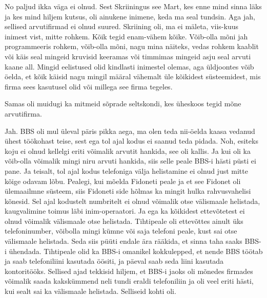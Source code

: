 
No paljud ikka väga ei olnud. Sest Skriiningus see Mart, kes enne mind sinna 
läks ja kes mind hiljem kutsus, oli ainukene inimene, keda ma seal tundsin. Aga 
jah, sellised arvutifirmad ei olnud suured. Skriining oli, ma ei mäleta, viis-kuus 
inimest vist, mitte rohkem. Kõik tegid  enam-vähem kõike. Võib-olla 
mõni jah programmeeris rohkem, võib-olla mõni, nagu mina näiteks, vedas rohkem 
kaablit või käis seal mingeid kruvisid keeramas või timmimas mingeid asju seal 
arvuti kaane all. Mingid eelistused olid kindlasti inimestel olemas, aga 
üldjoontes võib öelda, et kõik käisid nagu mingil määral vähemalt üle kõikidest 
 süsteemidest, mis firma  sees kasutusel olid või millega see firma tegeles.

Samas oli muidugi ka mitmeid sõprade seltskondi, kes üheskoos tegid mõne arvutifirma.


Jah. BBS  oli mul üleval päris pikka aega, ma olen teda nii-öelda kaasa vedanud 
 ühest töökohast teise, sest ega tol ajal kodus ei saanud teda pidada. Noh, 
esiteks koju ei olnud kellelgi eriti võimalik arvutit hankida, see oli kallis. 
Ja kui oli ka võib-olla võimalik mingi niru arvuti hankida, siis selle peale 
BBS-i hästi püsti ei pane. Ja teisalt, tol ajal kodus telefoniga 
välja helistamine ei olnud just mitte kõige odavam lõbu. Pealegi, kui mõelda 
Fidoneti peale ja et see Fidonet  oli ülemaailmne süsteem, siis Fidoneti side 
hõlmas ka mingit hulka rahvusvahelisi kõnesid. Sel ajal kodustelt numbritelt ei 
olnud  võimalik otse  välismaale helistada, kaugvalimine toimus läbi 
inim-operaatori. Ja ega ka kõikidest ettevõtetest  ei olnud võimalik välismaale 
otse helistada. Tihtipeale oli ettevõttes ainult üks telefoninumber, võibolla mingi kümne 
või saja telefoni peale, kust sai otse välismaale helistada. Seda siis püüti 
endale ära rääkida, et sinna taha saaks BBS-i ühendada. Tihtipeale olid ka 
BBS-i omanikel kokkulepped, et nende BBS töötab ja saab telefoniliini kasutada 
öösiti, ja päeval saab seda liini kasutada kontoritööks. 
Sellised ajad tekkisid hiljem, et BBS-i jaoks oli mõnedes firmades võimalik 
saada kakskümmend neli tundi eraldi telefoniliin ja oli veel eriti hästi, kui sealt sai ka 
välismaale helistada. Selliseid kohti oli. 

